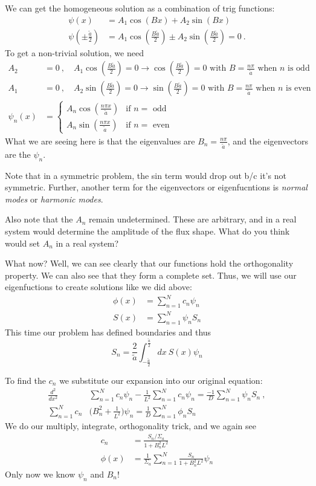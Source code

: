 \documentclass[12pt]{article}
\begin{document}
We can get the homogeneous solution as a combination of trig functions:
\begin{align*}
\psi(x) &= A_1 \cos(Bx) + A_2 \sin(Bx)\\
\psi(\pm \frac{\tilde{a}}{2}) &= A_1 \cos(\frac{B \tilde{a}}{2}) \pm A_2 \sin(\frac{B \tilde{a}}{2}) = 0 \:.
\end{align*}
To get a non-trivial solution, we need
\begin{align*}
A_2 &= 0 \:, \quad A_1\cos(\frac{B \tilde{a}}{2}) = 0 \rightarrow \cos(\frac{B \tilde{a}}{2}) = 0 \text{ with } B=\frac{n \pi}{\tilde{a}} \text{ when }n \text{ is odd}\\
A_1 &= 0 \:, \quad A_2\sin(\frac{B \tilde{a}}{2}) = 0 \rightarrow \sin(\frac{B \tilde{a}}{2})  = 0 \text{ with } B = \frac{n \pi}{\tilde{a}} \text{ when }n \text{ is even}\\
\psi_n(x) &= 
\left\{
	\begin{array}{ll}
		A_n \cos(\frac{n \pi x}{\tilde{a}})  & \mbox{if } n = \text{ odd} \\
		A_n \sin(\frac{n \pi x}{\tilde{a}}) & \mbox{if } n = \text{ even}
	\end{array}
	\right.
\end{align*}
%
What we are seeing here is that the eigenvalues are $B_n = \frac{n \pi}{\tilde{a}}$, and the eigenvectors are the $\psi_n$. 

Note that in a symmetric problem, the sin term would drop out b/c it's not symmetric. Further, another term for the eigenvectors or eigenfucntions is \textit{normal modes} or \textit{harmonic modes}. 

Also note that the $A_n$ remain undetermined. These are arbitrary, and in a real system would determine the amplitude of the flux shape. What do you think would set $A_n$ in a real system?

What now? Well, we can see clearly that our functions hold the orthogonality property. We can also see that they form a complete set. Thus, we will use our eigenfuctions to create solutions like we did above:
\begin{align*}
\phi(x) &= \sum_{n=1}^N c_n \psi_n \\
S(x) &= \sum_{n=1}^N \psi_n S_n
\end{align*}
This time our problem has defined boundaries and thus
\[
S_n = \frac{2}{\tilde{a}} \int_{-\frac{\tilde{a}}{2}}^{\frac{\tilde{a}}{2}} dx\: S(x) \psi_n
\]

To find the $c_n$ we substitute our expansion into our original equation:
\begin{align*}
\frac{d^2 }{dx^2} &\sum_{n=1}^N c_n \psi_n - \frac{1}{L^2} \sum_{n=1}^N c_n \psi_n = \frac{-1}{D}\sum_{n=1}^N \psi_n S_n\:,\\
%
\sum_{n=1}^N c_n& \bigl( B^2_n + \frac{1}{L^2}\bigr)\psi_n = \frac{1}{D}\sum_{n=1}^N \phi_n S_n
\end{align*}
We do our multiply, integrate, orthogonality trick, and we again see
\begin{align*}
c_n &= \frac{S_n / \Sigma_a}{1 + B_n^2  L^2} \\
\phi(x) &= \frac{1}{\Sigma_a} \sum_{n=1}^N \frac{S_n}{1 + B_n^2  L^2} \psi_n
\end{align*}
Only now we know $\psi_n$ and $B_n$!
\end{document}

